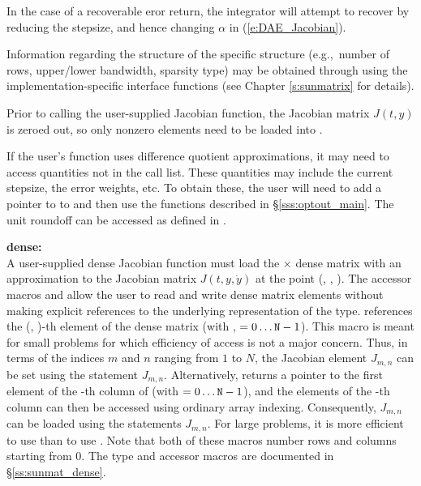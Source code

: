 {{  In the case of a recoverable eror return,
  the integrator will attempt to recover by reducing the stepsize,
  and hence changing $\alpha$ in (\ref{e:DAE_Jacobian}).
}
{
  Information regarding the structure of the specific {\sunmatrix}
  structure (e.g.,~number of rows, upper/lower bandwidth, sparsity
  type) may be obtained through using the implementation-specific
  {\sunmatrix} interface functions (see Chapter \ref{s:sunmatrix} for
  details).

  Prior to calling the user-supplied Jacobian function, the Jacobian
  matrix $J(t,y)$ is zeroed out, so only nonzero elements need to be
  loaded into .

  If the user's  function uses difference
  quotient approximations, it may need to access quantities not in the
  call list. These quantities may include the current stepsize, the error weights, etc.
  To obtain these, the user will need to add a pointer to 
  to  and then use the  functions described in
  \S\ref{sss:optout_main}. The unit roundoff can be accessed as
   defined in .

  {\bf dense:}\\
  A user-supplied dense Jacobian function must load the  $\times$ 
  dense matrix  with an approximation to the Jacobian matrix $J(t,y,\dot{y})$
  at the point (, , ).  The accessor macros 
  and  allow the user to read and write dense matrix
  elements without making explicit references to the underlying
  representation of the {\sunmatdense} type.
   references the (, )-th
  element of the dense matrix  (with , $= 0\ldots
  {\tt N}-1$). This macro is meant for small problems for which efficiency
  of access is not a major concern.  Thus, in terms of the indices $m$
  and $n$ ranging from $1$ to $N$, the Jacobian element $J_{m,n}$ can
  be set using the statement 
  $J_{m,n}$.  Alternatively,  returns a
  pointer to the first element of the -th column of 
  (with $= 0\ldots {\tt N}-1$), and the elements of the -th column
  can then be accessed using ordinary array indexing.  Consequently,
  $J_{m,n}$ can be loaded using the statements
    $J_{m,n}$.
  For large problems, it is more efficient to use 
  than to use .  Note that both of these macros
  number rows and columns starting from $0$.  The {\sunmatdense} type
  and accessor macros are documented in \S\ref{ss:sunmat_dense}.

}}

